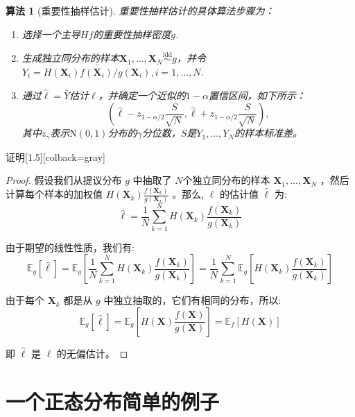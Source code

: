 \documentclass[UTF8,12pt,twoside]{ctexart}
\numberwithin{equation}{section}%
\newtheorem{Algorithm}{算法}[section]
\begin{document}
	
	
	\begin{Algorithm}[重要性抽样估计]重要性抽样估计的具体算法步骤为：
		\begin{enumerate}
			\item 选择一个主导$Hf$的重要性抽样密度$g$.
			\item  生成独立同分布的样本$\mathbf{X}_1, \ldots, \mathbf{X}_N \stackrel{\text{idd}}{\sim} g$，并令$Y_i=H\left(\mathbf{X}_i\right) f\left(\mathbf{X}_i\right) / g\left(\mathbf{X}_i\right), i=1, \ldots, N$.
			\item 通过$\widehat{\ell}=\bar{Y}$估计$\ell$，并确定一个近似的$1-\alpha$置信区间，如下所示：
			$$
			\left(\widehat{\ell}-z_{1-\alpha / 2} \frac{S}{\sqrt{N}}, \widehat{\ell}+z_{1-\alpha / 2} \frac{S}{\sqrt{N}}\right),
			$$
			其中$z_\gamma$表示$\mathrm{N}(0,1)$分布的$\gamma$分位数，$S$是$Y_1, \ldots, Y_N$的样本标准差。
		\end{enumerate}
		
		
	\end{Algorithm}
	
	
	\begin{simplesquarebox}[无偏性]{证明}[1.5][colback=gray]
		\begin{proof}
			假设我们从提议分布 $g$ 中抽取了 $N$个独立同分布的样本 $\mathbf{X}_1, \ldots, \mathbf{X}_N$ ，然后计算每个样本的加权值 $H\left(\mathbf{X}_k\right) \frac{f\left(\mathbf{X}_k\right)}{g\left(\mathbf{X}_k\right)}$ 。那么, $\ell$ 的估计值 $\hat{\ell}$ 为:
			$$
			\hat{\ell}=\frac{1}{N} \sum_{k=1}^N H\left(\mathbf{X}_k\right) \frac{f\left(\mathbf{X}_k\right)}{g\left(\mathbf{X}_k\right)}
			$$
			
			由于期望的线性性质，我们有:
			$$
			\mathbb{E}_g[\hat{\ell}]=\mathbb{E}_g\left[\frac{1}{N} \sum_{k=1}^N H\left(\mathbf{X}_k\right) \frac{f\left(\mathbf{X}_k\right)}{g\left(\mathbf{X}_k\right)}\right]=\frac{1}{N} \sum_{k=1}^N \mathbb{E}_g\left[H\left(\mathbf{X}_k\right) \frac{f\left(\mathbf{X}_k\right)}{g\left(\mathbf{X}_k\right)}\right]
			$$
			
			由于每个 $\mathbf{X}_k$ 都是从 $g$ 中独立抽取的，它们有相同的分布，所以:
			$$
			\mathbb{E}_g[\hat{\ell}]=\mathbb{E}_g\left[H(\mathbf{X}) \frac{f(\mathbf{X})}{g(\mathbf{X})}\right]=\mathbb{E}_f[H(\mathbf{X})]
			$$
			
			即 $\hat{\ell}$ 是 $\ell$ 的无偏估计。
		\end{proof}
	\end{simplesquarebox}
	
	\section{一个正态分布简单的例子}
	
\end{document}
